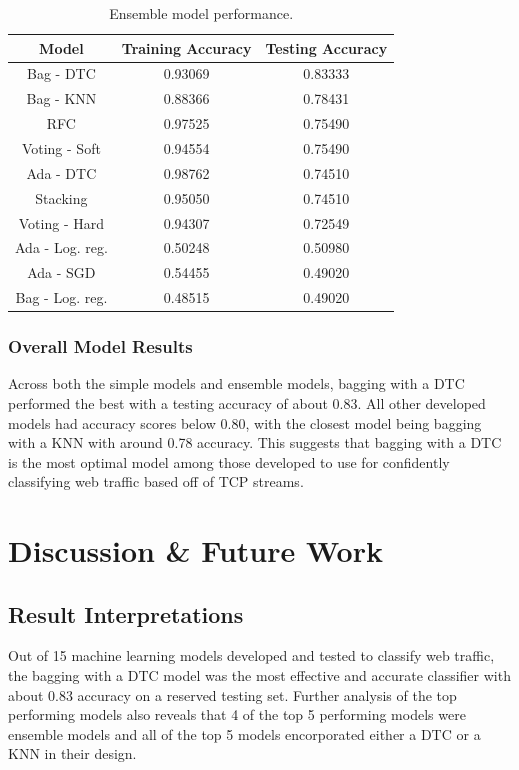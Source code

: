 \documentclass[10pt,sigconf,letterpaper,nonacm]{acmart}
\begin{document}
\begin{table}[h]
  \caption{Ensemble model performance.}
  \label{tab:ensemble}
  \begin{tabular}{ccc}
    \toprule
    Model & Training Accuracy & Testing Accuracy \\
    \midrule
    Bag - DTC & 0.93069 & 0.83333 \\
    Bag - KNN & 0.88366 & 0.78431 \\
    RFC & 0.97525 & 0.75490 \\
    Voting - Soft & 0.94554 & 0.75490 \\
    Ada - DTC & 0.98762 & 0.74510 \\
    Stacking & 0.95050 & 0.74510 \\
    Voting - Hard & 0.94307 & 0.72549 \\
    Ada - Log. reg. & 0.50248 & 0.50980 \\
    Ada - SGD & 0.54455 & 0.49020 \\
    Bag - Log. reg. & 0.48515 & 0.49020 \\
    \bottomrule
  \end{tabular}
\end{table}

\subsubsection{Overall Model Results}

Across both the simple models and ensemble models, bagging with a DTC performed the best with a testing accuracy of about 0.83.
All other developed models had accuracy scores below 0.80, with the closest model being bagging with a KNN with around 0.78 accuracy.
This suggests that bagging with a DTC is the most optimal model among those developed to use for confidently classifying web traffic based off of TCP streams.


\section{Discussion \& Future Work}

\subsection{Result Interpretations}

Out of 15 machine learning models developed and tested to classify web traffic, the bagging with a DTC model was the most effective and accurate classifier with about 0.83 accuracy on a reserved testing set.
Further analysis of the top performing models also reveals that 4 of the top 5 performing models were ensemble models and all of the top 5 models encorporated either a DTC or a KNN in their design.
\end{document}
